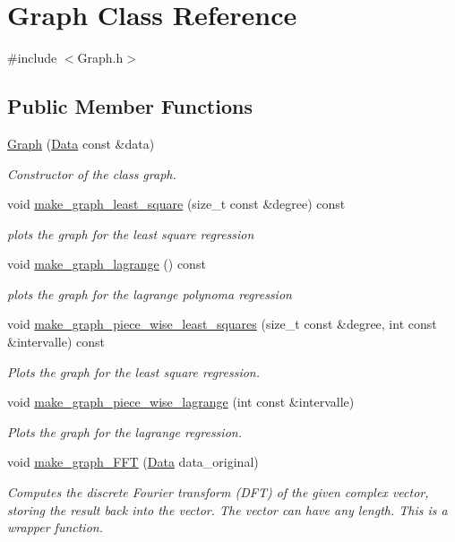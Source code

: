 \hypertarget{class_graph}{}\section{Graph Class Reference}
\label{class_graph}


{\ttfamily \#include $<$Graph.\+h$>$}

\subsection*{Public Member Functions}
\begin{DoxyCompactItemize}
\item 
\mbox{\hyperlink{class_graph_ac2cc4f7971589f9674f4fbf3b7dc200c}{Graph}} (\mbox{\hyperlink{struct_data}{Data}} const \&data)
\begin{DoxyCompactList}\small\item\em Constructor of the class graph. \end{DoxyCompactList}\item 
void \mbox{\hyperlink{class_graph_af3560cb4e5eaa08c33e3de253a4e60a3}{make\+\_\+graph\+\_\+least\+\_\+square}} (size\+\_\+t const \&degree) const
\begin{DoxyCompactList}\small\item\em plots the graph for the least square regression \end{DoxyCompactList}\item 
void \mbox{\hyperlink{class_graph_a5fd01460d3981748a22269f9953d3486}{make\+\_\+graph\+\_\+lagrange}} () const
\begin{DoxyCompactList}\small\item\em plots the graph for the lagrange polynoma regression \end{DoxyCompactList}\item 
void \mbox{\hyperlink{class_graph_a00bb733092d1c97735b6fbc767a8cedf}{make\+\_\+graph\+\_\+piece\+\_\+wise\+\_\+least\+\_\+squares}} (size\+\_\+t const \&degree, int const \&intervalle) const
\begin{DoxyCompactList}\small\item\em Plots the graph for the least square regression. \end{DoxyCompactList}\item 
void \mbox{\hyperlink{class_graph_a4de7bd5074f188b470392920df1c7ada}{make\+\_\+graph\+\_\+piece\+\_\+wise\+\_\+lagrange}} (int const \&intervalle)
\begin{DoxyCompactList}\small\item\em Plots the graph for the lagrange regression. \end{DoxyCompactList}\item 
void \mbox{\hyperlink{class_graph_a5326be30b090c2ba956d0e0211895fcd}{make\+\_\+graph\+\_\+\+F\+FT}} (\mbox{\hyperlink{struct_data}{Data}} data\+\_\+original)
\begin{DoxyCompactList}\small\item\em Computes the discrete Fourier transform (D\+FT) of the given complex vector, storing the result back into the vector. The vector can have any length. This is a wrapper function. \end{DoxyCompactList}\end{DoxyCompactItemize}


